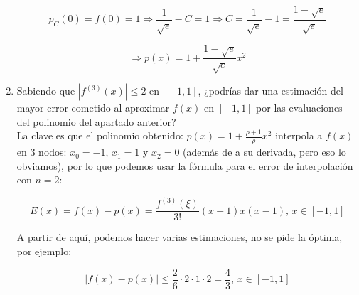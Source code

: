 \documentclass[12pt]{article}
\begin{document}
\begin{ejercicio}[2 puntos]
\begin{enumerate}[label=\alph*)]
			$$ p_C(0)= f(0) = 1 \Rightarrow \frac{1}{\sqrt{e}}-C=1 \Rightarrow C=\frac{1}{\sqrt{e}}-1=\frac{1-\sqrt{e}}{\sqrt{e}}$$
			
			$$ \Rightarrow p(x)= 1+\frac{1-\sqrt{e}}{\sqrt{e}}x^2$$
			
			\item Sabiendo que $|f^{(3)}(x)| \leq 2$ en $[-1, 1]$, ¿podrías dar una estimación del mayor error cometido al aproximar $f(x)$ en $[-1, 1]$ por las evaluaciones del polinomio del apartado anterior? \\
			
			La clave es que el polinomio obtenido: $p(x) = 1 + \frac{\rho + 1}{\rho} x^2$ interpola a $f(x)$ en 3 nodos: $x_0 = -1$, $x_1 = 1$ y $x_2 = 0$ (además de a su derivada, pero eso lo obviamos), por lo que podemos usar la fórmula para el error de interpolación con $n = 2$:
	
			$$E(x) = f(x) - p(x) = \frac{f^{(3)}(\xi)}{3!} (x + 1)x(x - 1), \, x \in [-1,1]$$
			
			A partir de aquí, podemos hacer varias estimaciones, no se pide la óptima, por ejemplo:
			
			$$ |f(x)-p(x)| \leq \frac{2}{6}\cdot 2 \cdot 1 \cdot 2 = \frac{4}{3}, \,  x \in [-1,1] $$
			
		\end{enumerate}
	\end{ejercicio}
\end{document}
